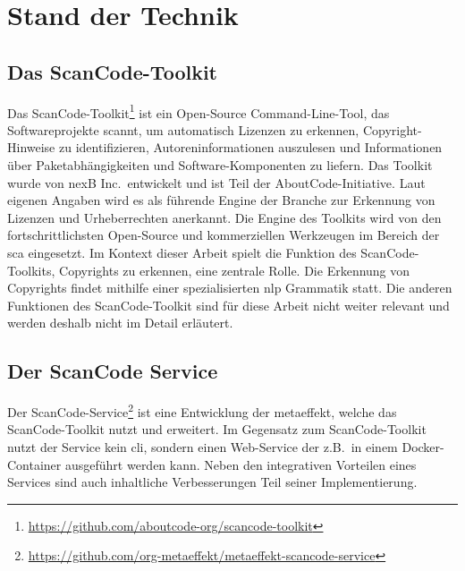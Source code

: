 \chapter{Stand der Technik}\label{ch:stand-der-technik}


\section{Das ScanCode-Toolkit}\label{sec:scancode-toolkit}

Das ScanCode-Toolkit\footnote{\url{https://github.com/aboutcode-org/scancode-toolkit}} ist ein Open-Source Command-Line-Tool, das Softwareprojekte scannt, um automatisch Lizenzen zu erkennen, Copyright-Hinweise zu identifizieren, Autoreninformationen auszulesen und Informationen über Paketabhängigkeiten und Software-Komponenten zu liefern.
Das Toolkit wurde von nexB Inc.\ entwickelt und ist Teil der AboutCode-Initiative.
Laut eigenen Angaben wird es als führende Engine der Branche zur Erkennung von Lizenzen und Urheberrechten anerkannt.
Die Engine des Toolkits wird von den fortschrittlichsten Open-Source und kommerziellen Werkzeugen im Bereich der \gls{sca} eingesetzt.
Im Kontext dieser Arbeit spielt die Funktion des ScanCode-Toolkits, Copyrights zu erkennen, eine zentrale Rolle.
Die Erkennung von Copyrights findet mithilfe einer spezialisierten \gls{nlp} Grammatik statt.
Die anderen Funktionen des ScanCode-Toolkit sind für diese Arbeit nicht weiter relevant und werden deshalb nicht im Detail erläutert\autocite{noauthor_scancode-toolkit-documentation_nodate}.


\section{Der ScanCode Service}\label{sec:scancode-service}

Der ScanCode-Service\footnote{\url{https://github.com/org-metaeffekt/metaeffekt-scancode-service}} ist eine Entwicklung der metaeffekt, welche das ScanCode-Toolkit nutzt und erweitert.
Im Gegensatz zum ScanCode-Toolkit nutzt der Service kein \gls{cli}, sondern einen Web-Service der z.B.\ in einem Docker-Container ausgeführt werden kann.
Neben den integrativen Vorteilen eines Services sind auch inhaltliche Verbesserungen Teil seiner Implementierung.

